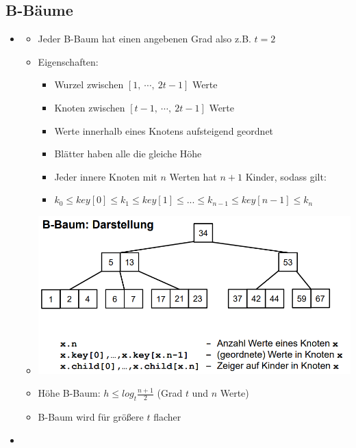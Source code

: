 \documentclass[
    12pt,
    a4paper,
    ngerman,
    color=3b,%
    marginpar=false,
    colorback=false,
    leqno,
]{tudaexercise}
\begin{document}
    \subsection{B-Bäume}\label{B-Baeume}
    \begin{itemize}
        \item {}
            \begin{itemize}
                \item Jeder B-Baum hat einen angebenen Grad also z.B. $t=2$
                \item Eigenschaften:
                    \begin{itemize}
                        \item Wurzel zwischen $[1,~\cdots,~2t-1]$ Werte
                        \item Knoten zwischen $[t-1,~\cdots,~2t-1]$ Werte
                        \item Werte innerhalb eines Knotens aufsteigend geordnet
                        \item Blätter haben alle die gleiche Höhe
                        \item Jeder innere Knoten mit $n$ Werten hat $n+1$ Kinder, sodass gilt:
                        \item[] $k_0 \leq key[0] \leq k_1 \leq key[1] \leq ... \leq k_{n-1} \leq key[n-1] \leq k_n$
                    \end{itemize}
                \item[] \includegraphics[width=15cm]{pictures/bbaum.PNG}
                \item Höhe B-Baum: $h \leq log_t \frac{n+1}{2}$ (Grad $t$ und $n$ Werte)
                \item B-Baum wird für größere $t$ flacher
            \end{itemize}
        \clearpage
        \item {}

\end{itemize}
\end{document}

